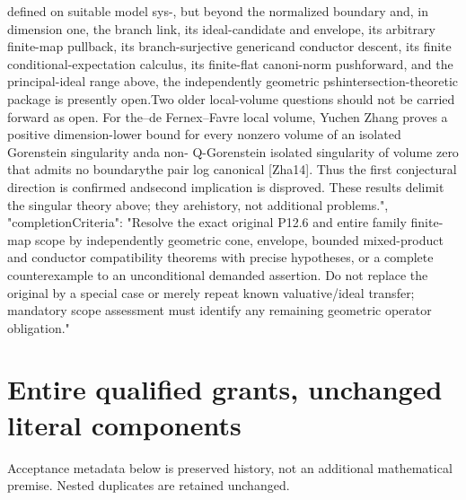 \documentclass[11pt]{article}
\begin{document}
\begin{GrantData}
{deﬁned on suitable model sys-\ntems, but beyond the normalized boundary and, in dimension one, the branch link, its ideal-\npsh candidate and envelope, its arbitrary ﬁnite-map pullback, its branch-surjective generic\ntrace and conductor descent, its ﬁnite conditional-expectation calculus, its ﬁnite-ﬂat canoni-\ncal norm pushforward, and the principal-ideal range above, the independently geometric psh\nand intersection-theoretic package is presently open.\n    Two older local-volume questions should not be carried forward as open. For the\nBoucksom–de Fernex–Favre local volume, Yuchen Zhang proves a positive dimension-\ndependent lower bound for every nonzero volume of an isolated Gorenstein singularity and\n{}\n\nconstructs a non- Q-Gorenstein isolated singularity of volume zero that admits no boundary\nmaking the pair log canonical [Zha14]. Thus the ﬁrst conjectural direction is conﬁrmed and\nthe second implication is disproved. These results delimit the singular theory above; they are\nresolved history, not additional problems.\n\n\n\n{}\n\n",
  "completionCriteria": "Resolve the exact original P12.6 and entire family finite-map scope by independently geometric cone, envelope, bounded mixed-product and conductor compatibility theorems with precise hypotheses, or a complete counterexample to an unconditional demanded assertion. Do not replace the original by a special case or merely repeat known valuative/ideal transfer; mandatory scope assessment must identify any remaining geometric operator obligation."
}

\end{GrantData}
\section{Entire qualified grants, unchanged literal components}
Acceptance metadata below is preserved history, not an additional mathematical premise. Nested duplicates are retained unchanged.
\end{document}
